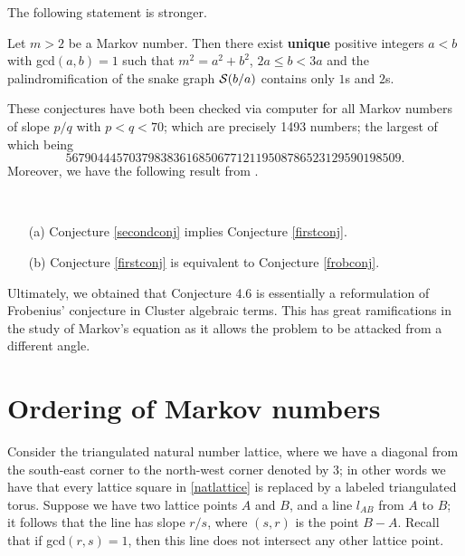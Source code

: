The following statement is stronger.
\begin{conjecture}\label{secondconj}
    Let $m>2$ be a Markov number. Then there exist \textbf{unique} positive integers $a<b$ with gcd$(a,b) = 1$ such that $m^2 = a^2 + b^2$, $2a \leq b < 3a$ and the palindromification of the snake graph $\mathcal{S}(b/a)$ contains only $1$s and $2$s.
\end{conjecture}
These conjectures have both been checked via computer for all Markov numbers of slope $p/q$ with $p < q < 70$; which are precisely 1493 numbers; the largest of which being
\begin{equation*}
    56790444570379838361685067712119508786523129590198509.
\end{equation*}
Moreover, we have the following result from \cite{CS1}.
\begin{theorem}~
    \begin{itemize}
        \item[(a)] Conjecture \ref{secondconj} implies Conjecture \ref{firstconj}.
        \item[(b)] Conjecture \ref{firstconj} is equivalent to Conjecture \ref{frobconj}.
    \end{itemize}
\end{theorem}
Ultimately, we obtained that Conjecture 4.6 is essentially a reformulation of Frobenius' conjecture in Cluster algebraic terms. This has great ramifications in the study of Markov's equation as it allows the problem to be attacked from a different angle. 
\section{Ordering of Markov numbers}
Consider the triangulated natural number lattice, where we have a diagonal from the south-east corner to the north-west corner denoted by 3; in other words we have that every lattice square in \ref{natlattice} is replaced by a labeled triangulated torus. Suppose we have two lattice points $A$ and $B$, and a line $l_{AB}$ from $A$ to $B$; it follows that the line has slope $r/s$, where $(s,r)$ is the point $B-A$. Recall that if gcd$(r,s) =  1$, then this line does not intersect any other lattice point. 

